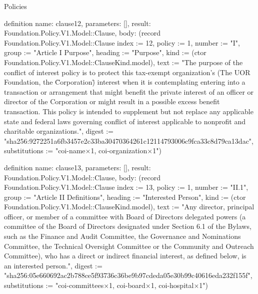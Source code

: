 \begin{lexlean}{Policies}
\begin{semanticmodule}
definition{
  name: clause12,
  parameters: [],
  result: Foundation.Policy.V1.Model::Clause,
  body: (record Foundation.Policy.V1.Model::Clause {index := 12, policy := 1, number := "I", group := "Article I Purpose", heading := "Purpose", kind := (ctor Foundation.Policy.V1.Model::ClauseKind.model), text := "The purpose of the conflict of interest policy is to protect this tax-exempt organization's (The UOR Foundation, the \"Corporation\") interest when it is contemplating entering into a transaction or arrangement that might benefit the private interest of an officer or director of the Corporation or might result in a possible excess benefit transaction. This policy is intended to supplement but not replace any applicable state and federal laws governing conflict of interest applicable to nonprofit and charitable organizations.", digest := "sha256:9272251a6fb3457e2c33ba30470364261c12114793006c9fca33c8d79ca13dac", substitutions := "coi-name×1, coi-organization×1"})
}

definition{
  name: clause13,
  parameters: [],
  result: Foundation.Policy.V1.Model::Clause,
  body: (record Foundation.Policy.V1.Model::Clause {index := 13, policy := 1, number := "II.1", group := "Article II Definitions", heading := "Interested Person", kind := (ctor Foundation.Policy.V1.Model::ClauseKind.model), text := "Any director, principal officer, or member of a committee with Board of Directors delegated powers (a committee of the Board of Directors designated under Section 6.1 of the Bylaws, such as the Finance and Audit Committee, the Governance and Nominations Committee, the Technical Oversight Committee or the Community and Outreach Committee), who has a direct or indirect financial interest, as defined below, is an interested person.", digest := "sha256:05e660692ac2b788ce5f93736c36be9b97cdeda05e30b99c40616eda232f155f", substitutions := "coi-committees×1, coi-board×1, coi-hospital×1"})
}


\end{semanticmodule}
\end{lexlean}
